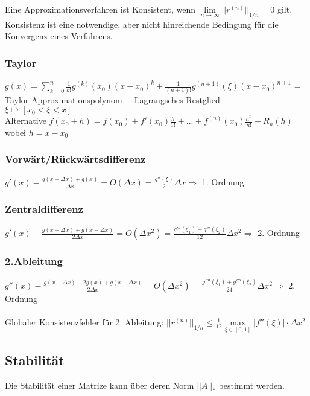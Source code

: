 Eine Approximationsverfahren ist Konsistent, wenn $\boxed{\lim\limits_{n\rightarrow \infty}||r^{(n)}||_{1/n}=0}$ gilt.\\

Konsistenz ist eine notwendige, aber nicht hinreichende Bedingung für die Konvergenz eines Verfahrens.

\subsubsection{Taylor}
$g(x)= \sum\limits_{k=0}^n\frac{1}{k!} g^{(k)}(x_0)(x-x_0)^k +
  \frac{1}{(n+1)!}g^{(n+1)}(\xi)(x-x_0)^{n+1}$ = Taylor
Approximationspolynom  + Lagrangsches Restglied\\
$\xi \longmapsto [x_0 < \xi < x]$\\

Alternative
$ f(x_0+h)=f(x_0)+f'(x_0)\frac{h}{1!}+...+f^{(n)}(x_0)\frac{h^n}{n!}+R_n(h) $ wobei $ h = x - x_0 $




\subsubsection{Vorwärt/Rückwärtsdifferenz}
$g'(x) - \frac{g(x+\Delta x) + g(x)}{\Delta x}= O(\Delta x) =
  \frac{g''(\xi)}{2}\Delta x \Rightarrow$  1. Ordnung


\subsubsection{Zentraldifferenz}
$g'(x) - \frac{g(x+\Delta x) + g(x-\Delta x)}{2\Delta x}= O(\Delta x^2) =
  \frac{g'''(\xi_1) + g'''(\xi_2)}{12}\Delta x^2 \Rightarrow$ 2. Ordnung



\subsubsection{2.Ableitung}
$g''(x) - \frac{g(x+\Delta x) -2 g(x)+ g(x-\Delta x)}{2\Delta x}= O(\Delta x^2) =
  \frac{g''''(\xi_1) + g''''(\xi_2)}{24}\Delta x^2 \Rightarrow$ 2. Ordnung\\
\\
Globaler Konsistenzfehler für 2. Ableitung: $||r^{(n)}||_{1/n}\leq \frac 1{12}\max\limits_{\xi\in[0,1]}|f''(\xi)|\cdot \Delta x^2$

\subsection{Stabilität}
Die Stabilität einer Matrize kann über deren Norm $||A||_*$ bestimmt werden.

